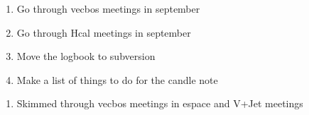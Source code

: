 

\begin{enumerate}
\item Go through vecbos meetings in september
\item Go through Hcal meetings in september
\item Move the logbook to subversion
\item Make a list of things to do for the candle note
\end{enumerate}


\begin{enumerate}
\item Skimmed through vecbos meetings in espace and V+Jet meetings
\end{enumerate}



